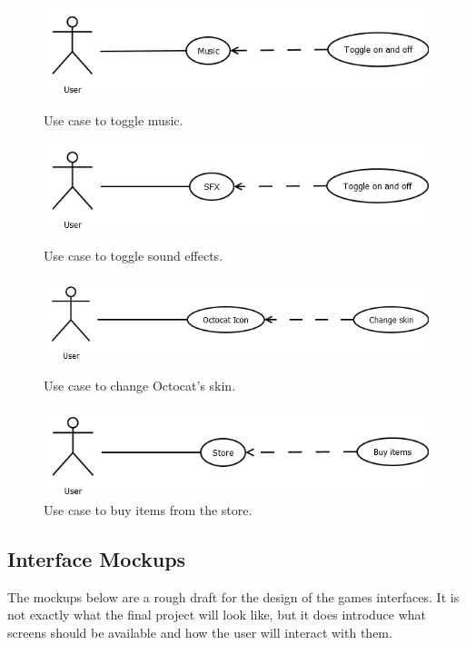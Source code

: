 \documentclass[10pt,conference,onecolumn,compsoc]{IEEEtran}
\begin{document}
\clearpage

\begin{figure}[h!]
\centering
\includegraphics[scale=.5]{Music.png}
\caption{Use case to toggle music.}
\label{Music}

\includegraphics[scale=.5]{SFX.png}
\caption{Use case to toggle sound effects.}
\label{SFX}

\includegraphics[scale=.5]{Octocat_Icon.png}
\caption{Use case to change Octocat's skin.}
\label{Skin}

\includegraphics[scale=.5]{Store.png}
\caption{Use case to buy items from the store.}
\label{Store}
\end{figure}

\clearpage

\subsection{Interface Mockups}
The mockups below are a rough draft for the design of the games interfaces. It is not exactly what the final project will look like, but it does introduce what screens should be available and how the user will interact with them.
\end{document}
